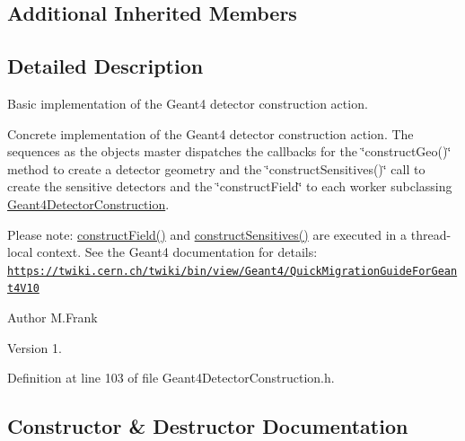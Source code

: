\subsection*{Additional Inherited Members}


\subsection{Detailed Description}
Basic implementation of the Geant4 detector construction action. 

Concrete implementation of the Geant4 detector construction action. The sequences as the object\textquotesingle{}s master dispatches the callbacks for the \char`\"{}construct\+Geo()\char`\"{} method to create a detector geometry and the \char`\"{}construct\+Sensitives()\char`\"{} call to create the sensitive detectors and the \char`\"{}construct\+Field\char`\"{} to each worker subclassing \hyperlink{class_d_d4hep_1_1_simulation_1_1_geant4_detector_construction}{Geant4\+Detector\+Construction}.

Please note\+: \hyperlink{class_d_d4hep_1_1_simulation_1_1_geant4_detector_construction_af7b296f1aa62b4d836c6275108953208}{construct\+Field()} and \hyperlink{class_d_d4hep_1_1_simulation_1_1_geant4_detector_construction_a852a3cd581f106a1f8c65122fb517dab}{construct\+Sensitives()} are executed in a thread-\/local context. See the Geant4 documentation for details\+: \href{https://twiki.cern.ch/twiki/bin/view/Geant4/QuickMigrationGuideForGeant4V10}{\tt https\+://twiki.\+cern.\+ch/twiki/bin/view/\+Geant4/\+Quick\+Migration\+Guide\+For\+Geant4\+V10}

\begin{DoxyAuthor}{Author}
M.\+Frank 
\end{DoxyAuthor}
\begin{DoxyVersion}{Version}
1. 
\end{DoxyVersion}


Definition at line 103 of file Geant4\+Detector\+Construction.\+h.



\subsection{Constructor \& Destructor Documentation}
\hypertarget{class_d_d4hep_1_1_simulation_1_1_geant4_detector_construction_a82b863f888681245e472b87ead98c344}{}\label{class_d_d4hep_1_1_simulation_1_1_geant4_detector_construction_a82b863f888681245e472b87ead98c344} 
